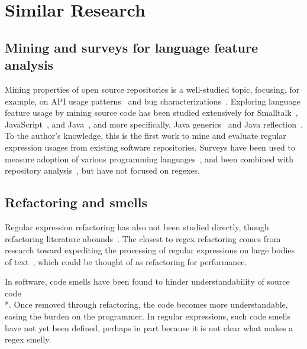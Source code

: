 \section{Similar Research}

\subsection{Mining and surveys for language feature analysis}
Mining properties of open source repositories is a well-studied topic, focusing, for example, on API usage patterns~ and bug characterizations~.
Exploring language feature usage by mining source code has been studied extensively for
Smalltalk~,
JavaScript~,
and Java~,
and more specifically,
Java generics~ and
Java reflection~.
To the author's knowledge, this is the first work to mine and evaluate regular expression usages from existing software repositories.
Surveys have been used to measure adoption of various programming languages~, and been combined with  repository analysis~, but have not focused on regexes.

\subsection{Refactoring and smells}
Regular expression refactoring has also not been studied directly, though refactoring literature abounds~.
The closest to regex refactoring comes from research toward  expediting the processing of regular expressions on large bodies of text~, which could be thought of as refactoring for performance.

In software, code smells have been found to hinder understandability of source code \\*.
Once removed through refactoring, the code becomes more understandable, easing the burden on the programmer.
In regular expressions, such code smells have not yet been defined, perhaps in part because it is not clear what makes a regex smelly.

